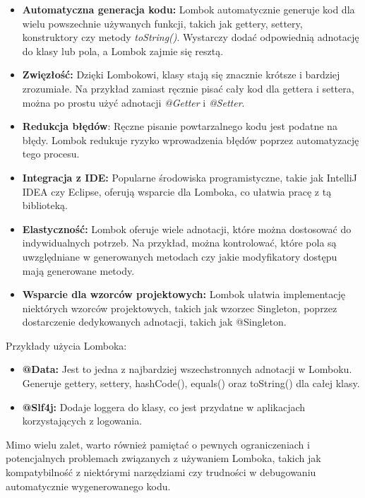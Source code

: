 \begin{itemize}
\item \textbf{Automatyczna generacja kodu:} Lombok automatycznie generuje kod dla wielu powszechnie używanych funkcji, takich jak gettery, settery, konstruktory czy metody \textit{toString()}. Wystarczy dodać odpowiednią adnotację do klasy lub pola, a Lombok zajmie się resztą.

\item \textbf{Zwięzłość:} Dzięki Lombokowi, klasy stają się znacznie krótsze i bardziej zrozumiałe. Na przykład zamiast ręcznie pisać cały kod dla gettera i settera, można po prostu użyć adnotacji \textit{@Getter} i \textit{@Setter}.

\item \textbf{Redukcja błędów}: Ręczne pisanie powtarzalnego kodu jest podatne na błędy. Lombok redukuje ryzyko wprowadzenia błędów poprzez automatyzację tego procesu.

\item \textbf{Integracja z IDE:} Popularne środowiska programistyczne, takie jak IntelliJ IDEA czy Eclipse, oferują wsparcie dla Lomboka, co ułatwia pracę z tą biblioteką.

\item \textbf{Elastyczność:} Lombok oferuje wiele adnotacji, które można dostosować do indywidualnych potrzeb. Na przykład, można kontrolować, które pola są uwzględniane w generowanych metodach czy jakie modyfikatory dostępu mają generowane metody.

\item \textbf{Wsparcie dla wzorców projektowych:} Lombok ułatwia implementację niektórych wzorców projektowych, takich jak wzorzec Singleton, poprzez dostarczenie dedykowanych adnotacji, takich jak @Singleton.
\end{itemize}

Przykłady użycia Lomboka:

\begin{itemize}
\item \textbf{@Data:} Jest to jedna z najbardziej wszechstronnych adnotacji w Lomboku. Generuje gettery, settery, hashCode(), equals() oraz toString() dla całej klasy.
\item \textbf{@Slf4j:} Dodaje loggera do klasy, co jest przydatne w aplikacjach korzystających z logowania.
\end{itemize} 
Mimo wielu zalet, warto również pamiętać o pewnych ograniczeniach i potencjalnych problemach związanych z używaniem Lomboka, takich jak kompatybilność z niektórymi narzędziami czy trudności w debugowaniu automatycznie wygenerowanego kodu\cite{lombokSpecs}.

